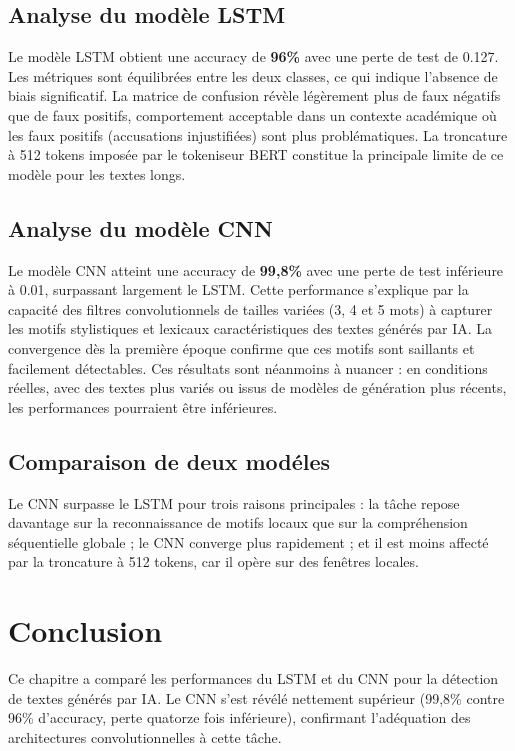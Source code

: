 \subsection{Analyse du modèle LSTM}

Le modèle LSTM obtient une accuracy de \textbf{96\%} avec une perte de test de 0.127.
Les métriques sont équilibrées entre les deux classes, ce qui indique l'absence de biais
significatif. La matrice de confusion révèle légèrement plus de faux négatifs que de faux
positifs, comportement acceptable dans un contexte académique où les faux positifs
(accusations injustifiées) sont plus problématiques. La troncature à 512 tokens imposée
par le tokeniseur BERT constitue la principale limite de ce modèle pour les textes longs.

\subsection{Analyse du modèle CNN}

Le modèle CNN atteint une accuracy de \textbf{99{,}8\%} avec une perte de test inférieure
à 0.01, surpassant largement le LSTM. Cette performance s'explique par la capacité des
filtres convolutionnels de tailles variées (3, 4 et 5 mots) à capturer les motifs
stylistiques et lexicaux caractéristiques des textes générés par IA. La convergence dès
la première époque confirme que ces motifs sont saillants et facilement détectables.
Ces résultats sont néanmoins à nuancer : en conditions réelles, avec des textes plus
variés ou issus de modèles de génération plus récents, les performances pourraient être
inférieures.

\subsection{Comparaison de deux modéles}

Le CNN surpasse le LSTM pour trois raisons principales : la tâche repose davantage sur
la reconnaissance de motifs locaux que sur la compréhension séquentielle globale ; le CNN
converge plus rapidement ; et il est moins affecté par la troncature à 512 tokens, car il
opère sur des fenêtres locales. 

\section{Conclusion}

Ce chapitre a comparé les performances du LSTM et du CNN pour la détection de textes
générés par IA. Le CNN s'est révélé nettement supérieur (99{,}8\% contre 96\% d'accuracy,
perte quatorze fois inférieure), confirmant l'adéquation des architectures convolutionnelles
à cette tâche.